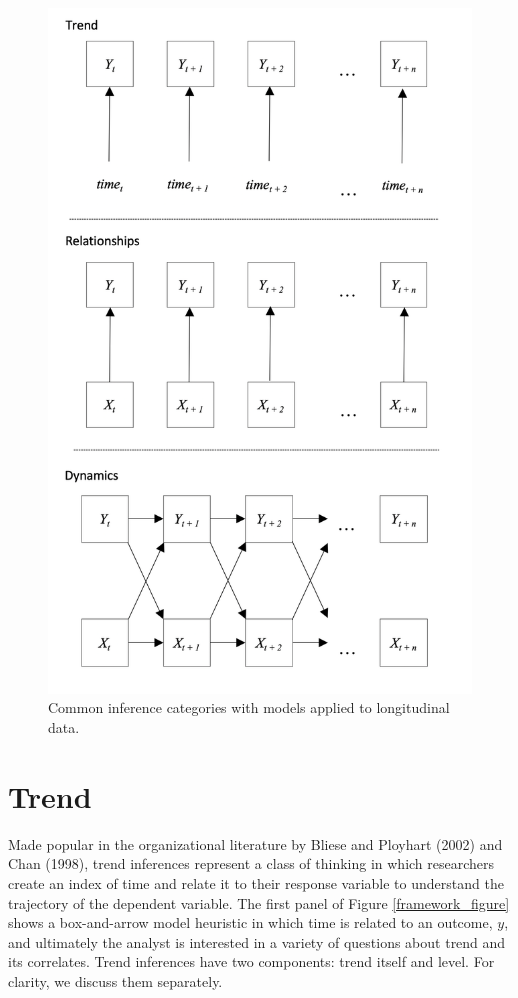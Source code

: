 \documentclass[english,,man]{apa6}
\theoremstyle{definition}
\theoremstyle{definition}
\theoremstyle{definition}
\theoremstyle{remark}
\begin{document}
\begin{figure}

{\centering \includegraphics[width=4.66in]{figures/dynamics/framework} 

}

\caption{Common inference categories with models applied to longitudinal data.\label{framework_figure}}\label{fig:unnamed-chunk-6}
\end{figure}

\hypertarget{trend}{%
\section{Trend}\label{trend}}

Made popular in the organizational literature by Bliese and Ployhart
(2002) and Chan (1998), trend inferences represent a class of thinking
in which researchers create an index of time and relate it to their
response variable to understand the trajectory of the dependent
variable. The first panel of Figure \ref{framework_figure} shows a
box-and-arrow model heuristic in which time is related to an outcome,
\(y\), and ultimately the analyst is interested in a variety of
questions about trend and its correlates. Trend inferences have two
components: trend itself and level. For clarity, we discuss them
separately.
\end{document}
